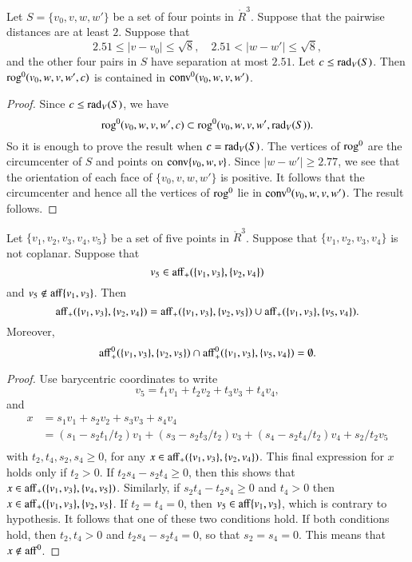 \begin{lemma}
Let $S=\{v_0,v,w,w'\}$ be a set of four points
in $\ring{R}^3$.  Suppose that the pairwise distances are at least
$2$.  Suppose that
   $$
   2.51\le |v-v_0|\le\sqrt8,\quad 2.51< |w-w'|\le\sqrt8,
   $$
and the other four pairs in $S$ have separation at most $2.51$.
Let $c\le \operatorname{rad}_V(S)$.
Then ${\operatorname{rog}}^0(v_0,w,v,w',c)$ is contained in
${\operatorname{conv}}^0(v_0,w,v,w')$.
\end{lemma}

\begin{proof}  Since $c\le \operatorname{rad}_V(S)$, we have
  $$
  {\operatorname{rog}}^0(v_0,w,v,w',c)\subset {\operatorname{rog}}^0(v_0,w,v,w',\operatorname{rad}_V(S)).
  $$
So it is enough to prove the result when $c=\operatorname{rad}_V(S)$.
The vertices of ${\operatorname{rog}}^0$ are the circumcenter of $S$ and points
on ${\operatorname{conv}}\{v_0,w,v\}$.
Since $|w-w'|\ge 2.77$, we see that the orientation of each face
of $\{v_0,v,w,w'\}$ is positive.   It follows that the circumcenter
and hence all
the vertices of ${\operatorname{rog}}^0$ lie in ${\operatorname{conv}}^0(v_0,w,v,w')$.
The result follows.
\end{proof}

\newpage

\begin{lemma}
Let $\{v_1,v_2,v_3,v_4,v_5\}$ be a set of five
points in $\ring{R}^3$.  Suppose that $\{v_1,v_2,v_3,v_4\}$ is
not coplanar.  Suppose that 
    $$v_5\in {\operatorname{aff}}_+(\{v_1,v_3\},\{v_2,v_4\})$$
and $v_5\not\in{\operatorname{aff}}\{v_1,v_3\}$.
Then 
    $$
    {\operatorname{aff}}_+(\{v_1,v_3\},\{v_2,v_4\}) = 
{\operatorname{aff}}_+(\{v_1,v_3\},\{v_2,v_5\}) \cup
{\operatorname{aff}}_+(\{v_1,v_3\},\{v_5,v_4\}).
    $$
Moreover,
   $$
{\operatorname{aff}}^0_+(\{v_1,v_3\},\{v_2,v_5\}) \cap
{\operatorname{aff}}^0_+(\{v_1,v_3\},\{v_5,v_4\}) =\emptyset.
   $$
\end{lemma}

\begin{proof}
Use barycentric coordinates to write
   $$
   v_5 = t_1 v_1 + t_2 v_2 + t_3 v_3 + t_4 v_4,
   $$
and 
    $$
    \begin{array}{lll}
    x &= s_1 v_1 + s_2 v_2 + s_3 v_3 + s_4 v_4 \\
      &= (s_1 - s_2 t_1/t_2) v_1 + (s_3 - s_2 t_3/t_2) v_3 +
        (s_4 - s_2 t_4/t_2) v_4 + s_2/t_2 v_5\\
    \end{array}
    $$
with $t_2,t_4,s_2,s_4\ge 0$,
for any $x\in{\operatorname{aff}}_+(\{v_1,v_3\},\{v_2,v_4\})$. 
This final expression for $x$ holds only if $t_2>0$.   
If $t_2 s_4 - s_2 t_4 \ge 0$, then this shows that 
$x\in{\operatorname{aff}}_+(\{v_1,v_3\},\{v_4,v_5\})$.
Similarly, if $s_2 t_4 - t_2 s_4\ge 0$ and $t_4>0$ then
$x\in{\operatorname{aff}}_+(\{v_1,v_3\},\{v_2,v_5\}$.
If $t_2=t_4=0$, then $v_5\in{\operatorname{aff}}\{v_1,v_3\}$, which is
contrary to hypothesis.  It follows that one of these two
conditions hold.  If both conditions hold, then $t_2,t_4>0$
and $t_2 s_4 - s_2 t_4 =0$, so that $s_2=s_4 = 0$.  This means
that $x\not\in{\operatorname{aff}}^0$.
\end{proof}

